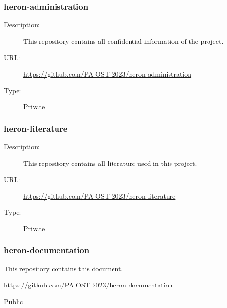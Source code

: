 \subsubsection{heron-administration} \vspace{-0.2cm}
\begin{description}
	\item[Description:] This repository contains all confidential information of the project.\vspace{-0.25cm}
	\item[URL:] \url{https://github.com/PA-OST-2023/heron-administration}\vspace{-0.25cm}
	\item[Type:] Private\vspace{-0.25cm}
\end{description}

\subsubsection{heron-literature} \vspace{-0.2cm}
\begin{description}
	\item[Description:] This repository contains all literature used in this project.\vspace{-0.25cm}
	\item[URL:] \url{https://github.com/PA-OST-2023/heron-literature}\vspace{-0.25cm}
	\item[Type:] Private\vspace{-0.25cm}
\end{description}

\subsubsection{heron-documentation} \vspace{-0.2cm}
\begin{description}
	\hfuzz=35.0pt
	\item[Description:] This repository contains this document.\vspace{-0.25cm}
	\item[URL:] \url{https://github.com/PA-OST-2023/heron-documentation}\vspace{-0.25cm}
	\item[Type:] Public\vspace{-0.25cm}
\end{description}

